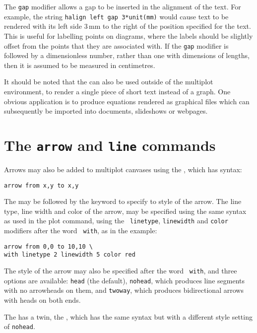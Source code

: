 \noindent The {\tt gap} modifier allows a gap to be inserted in the alignment
of the text. For example, the string {\tt halign left gap 3*unit(mm)} would
cause text to be rendered with its left side $3\,\mathrm{mm}$ to the right of
the position specified for the text. This is useful for labelling points on
diagrams, where the labels should be slightly offset from the points that they
are associated with. If the {\tt gap} modifier is followed by a dimensionless
number, rather than one with dimensions of lengths, then it is assumed to be
measured in centimetres.

It should be noted that the  can also be used outside of the
multiplot environment, to render a single piece of short text instead of a
graph. One obvious application is to produce equations rendered as graphical
files which can subsequently be imported into documents, slideshows or
webpages.

\section{The {\tt arrow} and {\tt line} commands}

Arrows may also be added to multiplot canvases using the , which
has syntax:

\begin{verbatim}
arrow from x,y to x,y
\end{verbatim}

The  may be followed by the  keyword to specify to
style of the arrow. The line type, line width and color of the arrow, may be
specified using the same syntax as used in the plot command, using the {\tt
linetype}, {\tt linewidth} and {\tt color} modifiers after the word {\tt
with}, as in the example:

\begin{verbatim}
arrow from 0,0 to 10,10 \
with linetype 2 linewidth 5 color red
\end{verbatim}

\noindent The style of the arrow may also be specified after the word {\tt
with}, and three options are available: {\tt head} (the default), {\tt nohead},
which produces line segments with no arrowheads on them, and {\tt twoway},
which produces bidirectional  arrows with heads on both ends.

The  has a twin, the , which has the same syntax
but with a different style setting of {\tt nohead}.

